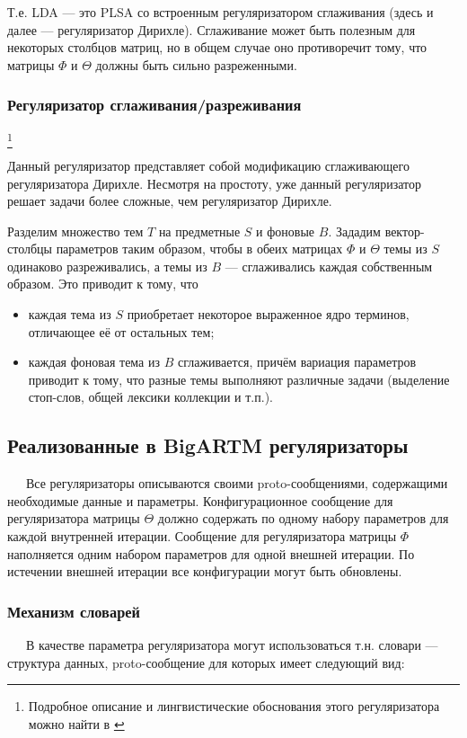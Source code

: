 Т.е. LDA --- это PLSA со встроенным регуляризатором сглаживания (здесь и далее --- регуляризатор Дирихле). Сглаживание может быть полезным для некоторых столбцов матриц, но в общем случае оно противоречит тому, что матрицы $\Phi$ и $\Theta$ должны быть сильно разреженными. 

\subsubsection{Регуляризатор сглаживания/разреживания}
\footnote{Подробное описание и лингвистические обоснования этого регуляризатора можно найти в \cite{voron_potap_14}}

 Данный регуляризатор представляет собой модификацию сглаживающего регуляризатора Дирихле. Несмотря на простоту, уже данный регуляризатор решает задачи более сложные, чем регуляризатор Дирихле.

Разделим множество тем $T$ на предметные $S$ и фоновые $B$. Зададим вектор-столбцы параметров таким образом, чтобы в обеих матрицах $\Phi$ и $\Theta$ темы из $S$ одинаково разреживались, а темы из $B$ --- сглаживались каждая собственным образом. Это приводит к тому, что 

\begin{itemize}
	\item каждая тема из $S$ приобретает некоторое выраженное ядро терминов, отличающее её от остальных тем;
	\item каждая фоновая тема из $B$ сглаживается, причём вариация параметров приводит к тому, что разные темы выполняют различные задачи (выделение стоп-слов, общей лексики коллекции и т.п.).
\end{itemize}  

\subsection{Реализованные в BigARTM регуляризаторы}

$\quad\;\:$Все регуляризаторы описываются своими proto-сообщениями, содержащими необходимые данные и параметры. Конфигурационное сообщение для регуляризатора матрицы $\Theta$ должно содержать по одному набору параметров для каждой внутренней итерации. Сообщение для регуляризатора матрицы $\Phi$ наполняется одним набором параметров для одной внешней итерации. По истечении внешней итерации все конфигурации могут быть обновлены.

\subsubsection{Механизм словарей} 
$\quad\;\:$В качестве параметра регуляризатора могут использоваться т.н. словари --- структура данных, proto-сообщение для которых имеет следующий вид:

